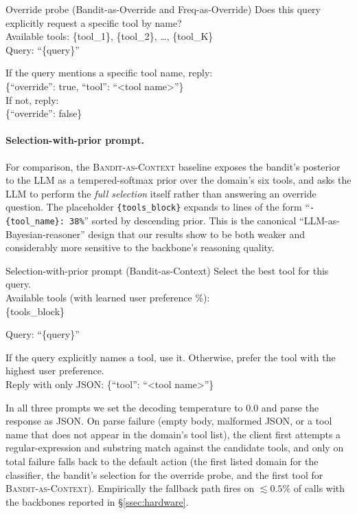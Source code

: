 \begin{promptbox}{Override probe (Bandit-as-Override and Freq-as-Override)}
Does this query explicitly request a specific tool by name?\\
Available tools: \{tool\_1\}, \{tool\_2\}, \ldots, \{tool\_K\}\\
Query: ``\{query\}''

If the query mentions a specific tool name, reply:\\
\hspace*{1em}\{``override'': true, ``tool'': ``<tool name>''\}\\
If not, reply:\\
\hspace*{1em}\{``override'': false\}
\end{promptbox}

\paragraph{Selection-with-prior prompt.}
For comparison, the \textsc{Bandit-as-Context} baseline exposes the
bandit's posterior to the LLM as a tempered-softmax prior over the
domain's six tools, and asks the LLM to perform the \emph{full
selection} itself rather than answering an override question. The
placeholder \texttt{\{tools\_block\}} expands to lines of the form
``\texttt{- \{tool\_name\}: 38\%}'' sorted by descending prior. This is
the canonical ``LLM-as-Bayesian-reasoner'' design that our results show
to be both weaker and considerably more sensitive to the backbone's
reasoning quality.

\begin{promptbox}{Selection-with-prior prompt (Bandit-as-Context)}
Select the best tool for this query.\\
Available tools (with learned user preference \%):\\
\{tools\_block\}

Query: ``\{query\}''

If the query explicitly names a tool, use it. Otherwise, prefer the
tool with the highest user preference.\\
Reply with only JSON: \{``tool'': ``<tool name>''\}
\end{promptbox}

In all three prompts we set the decoding temperature to $0.0$ and parse
the response as JSON. On parse failure (empty body, malformed JSON, or
a tool name that does not appear in the domain's tool list), the
client first attempts a regular-expression and substring match against
the candidate tools, and only on total failure falls back to the
default action (the first listed domain for the classifier, the
bandit's selection for the override probe, and the first tool for
\textsc{Bandit-as-Context}). Empirically the fallback path fires on
$\lesssim 0.5\%$ of calls with the backbones reported in
\S\ref{ssec:hardware}.
